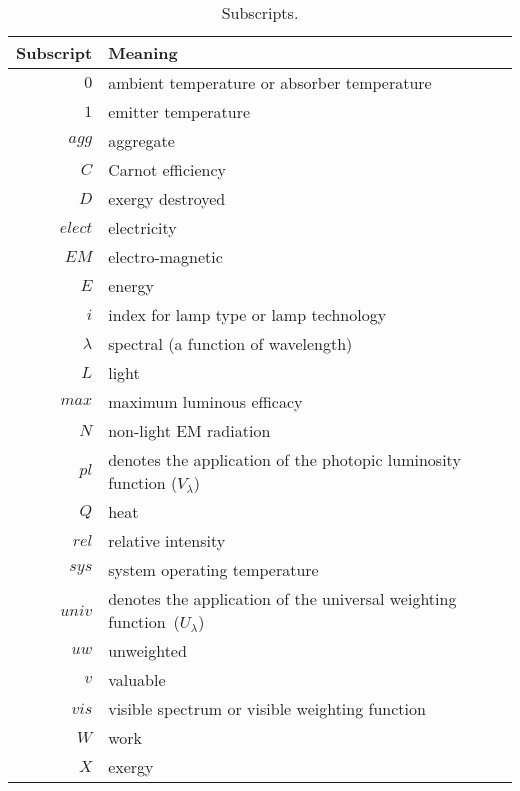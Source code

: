 \begin{table}
\centering
\caption{Subscripts.}
\begin{tabular}{r l}
\toprule
Subscript & Meaning \\
\midrule
$0$ & ambient temperature or absorber temperature \\
$1$ & emitter temperature \\
$agg$ & aggregate \\
$C$ & Carnot efficiency \\
$D$ & exergy destroyed \\
$elect$ & electricity \\
$E\!M$ & electro-magnetic \\
$E$ & energy \\
$i$ & index for lamp type or lamp technology \\
$\lambda$ & spectral (a function of wavelength) \\
$L$ & light \\
$max$ & maximum luminous efficacy \\
$N$ & non-light EM radiation \\
$pl$ & denotes the application of the photopic luminosity function ($V_{\lambda}$) \\
$Q$ & heat \\
$rel$ & relative intensity \\
$sys$ & system operating temperature \\
$univ$ & denotes the application of the universal weighting function~($U_\lambda$) \\
$uw$ & unweighted \\
$v$ & valuable \\
$vis$ & visible spectrum or visible weighting function \\
$W$ & work \\
$X$ & exergy \\
\bottomrule
\end{tabular}
\label{tab:subscripts}
\end{table}


